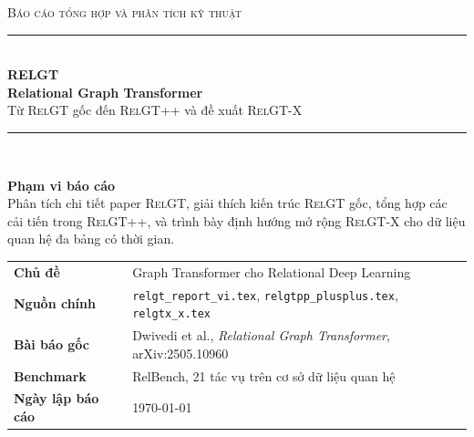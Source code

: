 \documentclass[12pt,a4paper]{article}
\newcommand{\RelGT}{\textsc{RelGT}}
\newcommand{\RelGTpp}{\textsc{RelGT++}}
\newcommand{\RelGTx}{\textsc{RelGT-X}}
\begin{document}
\begin{titlepage}
\centering
\vspace*{0.7cm}

{\small\scshape\color{gray!75} Báo cáo tổng hợp và phân tích kỹ thuật}\\[0.8em]
\rule{\textwidth}{2.4pt}\\[0.7em]
{\Huge\bfseries\color{mainblue} RELGT}\\[0.35em]
{\LARGE\bfseries Relational Graph Transformer}\\[0.45em]
{\Large\color{black!70} Từ \RelGT{} gốc đến \RelGTpp{} và đề xuất \RelGTx}\\[0.7em]
\rule{\textwidth}{1pt}\\[1.2em]

\begin{tcolorbox}[colback=softgray,colframe=gray!45,width=0.93\textwidth]
\centering
\textbf{Phạm vi báo cáo}\\[0.3em]
Phân tích chi tiết paper \RelGT{}, giải thích kiến trúc \RelGT{} gốc,
tổng hợp các cải tiến trong \RelGTpp{}, và trình bày định hướng mở rộng
\RelGTx{} cho dữ liệu quan hệ đa bảng có thời gian.
\end{tcolorbox}

\vspace{1.3em}
\begin{tabular}{ll}
\toprule
\textbf{Chủ đề} & Graph Transformer cho Relational Deep Learning \\
\textbf{Nguồn chính} & \texttt{relgt\_report\_vi.tex}, \texttt{relgtpp\_plusplus.tex}, \texttt{relgtx\_x.tex} \\
\textbf{Bài báo gốc} & Dwivedi et al., \textit{Relational Graph Transformer}, arXiv:2505.10960 \\
\textbf{Benchmark} & RelBench, 21 tác vụ trên cơ sở dữ liệu quan hệ \\
\textbf{Ngày lập báo cáo} & \today \\
\bottomrule
\end{tabular}

\vfill
{}

\vspace*{0.5cm}
\end{titlepage}
\end{document}
